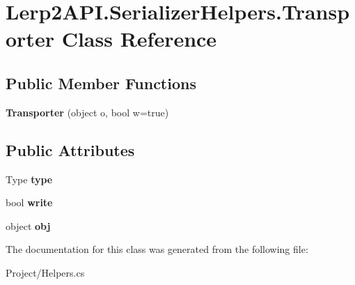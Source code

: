 \hypertarget{class_lerp2_a_p_i_1_1_serializer_helpers_1_1_transporter}{}\section{Lerp2\+A\+P\+I.\+Serializer\+Helpers.\+Transporter Class Reference}
\label{class_lerp2_a_p_i_1_1_serializer_helpers_1_1_transporter}
\subsection*{Public Member Functions}
\begin{DoxyCompactItemize}
\item 
\mbox{\label{class_lerp2_a_p_i_1_1_serializer_helpers_1_1_transporter_a056960a8fee3afcbb1b501a770a77b74}} 
{\bfseries Transporter} (object o, bool w=true)
\end{DoxyCompactItemize}
\subsection*{Public Attributes}
\begin{DoxyCompactItemize}
\item 
\mbox{\label{class_lerp2_a_p_i_1_1_serializer_helpers_1_1_transporter_a54d22c6e4cee65c7d43c643ee1b7ea8e}} 
Type {\bfseries type}
\item 
\mbox{\label{class_lerp2_a_p_i_1_1_serializer_helpers_1_1_transporter_ac2073e33756fd2916cc1f0e32c887271}} 
bool {\bfseries write}
\item 
\mbox{\label{class_lerp2_a_p_i_1_1_serializer_helpers_1_1_transporter_aa1253f725df5be23373255f7c2c74acc}} 
object {\bfseries obj}
\end{DoxyCompactItemize}


The documentation for this class was generated from the following file\+:\begin{DoxyCompactItemize}
\item 
Project/Helpers.\+cs\end{DoxyCompactItemize}
